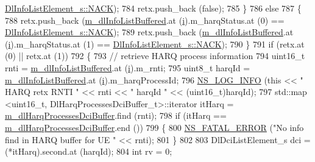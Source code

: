\begin{DoxyCode}
      \hyperlink{structns3_1_1DlInfoListElement__s_a3e55b89f756b7bd8909c8116a202a17aaf90e76e67c86729b4ee21927b7fb1770}{DlInfoListElement\_s::NACK});
784           retx.push\_back (\textcolor{keyword}{false});
785         \}
786       \textcolor{keywordflow}{else}
787         \{
788           retx.push\_back (\hyperlink{classns3_1_1FdMtFfMacScheduler_ac7f5da1ae0cf374d49f379b07c2c78a7}{m\_dlInfoListBuffered}.at (\hyperlink{bernuolliDistribution_8m_a6f6ccfcf58b31cb6412107d9d5281426}{i}).m\_harqStatus.at (0) == 
      \hyperlink{structns3_1_1DlInfoListElement__s_a3e55b89f756b7bd8909c8116a202a17aaf90e76e67c86729b4ee21927b7fb1770}{DlInfoListElement\_s::NACK});
789           retx.push\_back (\hyperlink{classns3_1_1FdMtFfMacScheduler_ac7f5da1ae0cf374d49f379b07c2c78a7}{m\_dlInfoListBuffered}.at (\hyperlink{bernuolliDistribution_8m_a6f6ccfcf58b31cb6412107d9d5281426}{i}).m\_harqStatus.at (1) == 
      \hyperlink{structns3_1_1DlInfoListElement__s_a3e55b89f756b7bd8909c8116a202a17aaf90e76e67c86729b4ee21927b7fb1770}{DlInfoListElement\_s::NACK});
790         \}
791       \textcolor{keywordflow}{if} (retx.at (0) || retx.at (1))
792         \{
793           \textcolor{comment}{// retrieve HARQ process information}
794           uint16\_t rnti = \hyperlink{classns3_1_1FdMtFfMacScheduler_ac7f5da1ae0cf374d49f379b07c2c78a7}{m\_dlInfoListBuffered}.at (\hyperlink{bernuolliDistribution_8m_a6f6ccfcf58b31cb6412107d9d5281426}{i}).m\_rnti;
795           uint8\_t harqId = \hyperlink{classns3_1_1FdMtFfMacScheduler_ac7f5da1ae0cf374d49f379b07c2c78a7}{m\_dlInfoListBuffered}.at (\hyperlink{bernuolliDistribution_8m_a6f6ccfcf58b31cb6412107d9d5281426}{i}).m\_harqProcessId;
796           \hyperlink{group__logging_gafbd73ee2cf9f26b319f49086d8e860fb}{NS\_LOG\_INFO} (\textcolor{keyword}{this} << \textcolor{stringliteral}{" HARQ retx RNTI "} << rnti << \textcolor{stringliteral}{" harqId "} << (uint16\_t)harqId);
797           std::map <uint16\_t, DlHarqProcessesDciBuffer\_t>::iterator itHarq = 
      \hyperlink{classns3_1_1FdMtFfMacScheduler_a8c331acf0a47c5bfe7d8ac19db83d814}{m\_dlHarqProcessesDciBuffer}.find (rnti);
798           \textcolor{keywordflow}{if} (itHarq == \hyperlink{classns3_1_1FdMtFfMacScheduler_a8c331acf0a47c5bfe7d8ac19db83d814}{m\_dlHarqProcessesDciBuffer}.end ())
799             \{
800               \hyperlink{group__fatal_ga5131d5e3f75d7d4cbfd706ac456fdc85}{NS\_FATAL\_ERROR} (\textcolor{stringliteral}{"No info find in HARQ buffer for UE "} << rnti);
801             \}
802 
803           DlDciListElement\_s dci = (*itHarq).second.at (harqId);
804           \textcolor{keywordtype}{int} rv = 0;

\end{DoxyCode}
